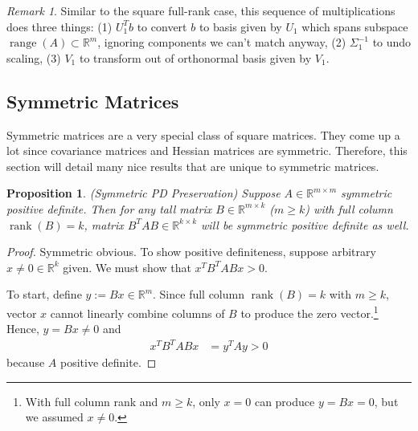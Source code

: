 \documentclass[12pt]{article}
\numberwithin{equation}{section} %
\theoremstyle{plain}
\newtheorem{prop}[thm]{Proposition}
\newtheorem{cor}[thm]{Corollary}
\theoremstyle{definition}
\theoremstyle{remark}
\newtheorem*{rmk}{Remark}
\newcommand{\R}{\mathbb{R}}
\newcommand{\Rm}{\mathbb{R}^m}
\newcommand{\Rk}{\mathbb{R}^k}
\newcommand{\Rmn}{\mathbb{R}^{m\times n}}
\newcommand{\Rmm}{\mathbb{R}^{m\times m}}
\newcommand{\Rkk}{\mathbb{R}^{k\times k}}
\newcommand{\range}{\operatorname{range}}
\newcommand{\rank}{\operatorname{rank}}
\begin{document}
\begin{rmk}
Similar to the square full-rank case, this sequence of multiplications
does three things:
(1) $U_1^Tb$ to convert $b$ to basis given by $U_1$ which spans
subspace $\range(A)\subset \Rm$, ignoring components we can't
match anyway, (2) $\Sigma_1^{-1}$ to undo scaling, (3) $V_1$ to
transform out of orthonormal basis given by $V_1$.
\end{rmk}









\clearpage
\subsection{Symmetric Matrices}

Symmetric matrices are a very special class of square matrices. They
come up a lot since covariance matrices and Hessian matrices are
symmetric.  Therefore, this section will detail many nice results that
are unique to
symmetric matrices.


\begin{prop}\emph{(Symmetric PD Preservation)}
Suppose $A\in\Rmm$ symmetric positive definite.
Then for any tall matrix $B\in\R^{m\times k}$ ($m\geq k$) with full
column $\rank(B)=k$, matrix $B^TAB\in\Rkk$ will be symmetric positive
definite as well.
\end{prop}
\begin{proof}
Symmetric obvious.
To show positive definiteness, suppose arbitrary $x\neq 0\in\Rk$ given.
We must show that $x^T B^TABx >0$.

To start, define $y:=Bx\in\Rm$.
Since full column $\rank(B)=k$ with $m\geq k$,
vector $x$ cannot linearly combine columns of $B$ to produce the
zero vector.\footnote{%
  With full column rank and $m\geq k$, only $x=0$ can produce $y=Bx=0$,
  but we assumed $x\neq 0$.
}
Hence, $y=Bx\neq 0$ and
\begin{align*}
  x^TB^TABx &= y^TAy > 0
\end{align*}
because $A$ positive definite.
\end{proof}
\end{document}

